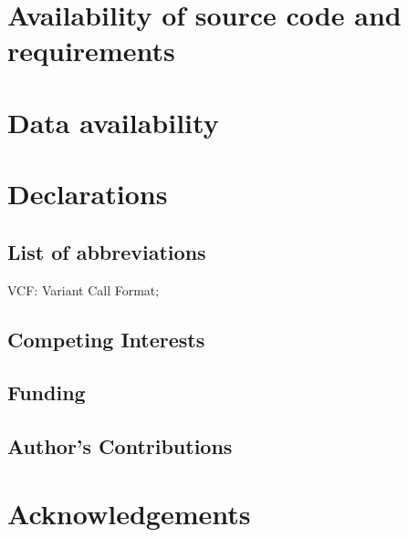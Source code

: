 \documentclass[a4paper,num-refs]{oup-contemporary}
\begin{document}
\section{Availability of source code and requirements}

\section{Data availability}

\section{Declarations}

\subsection{List of abbreviations}

VCF: Variant Call Format;

\subsection{Competing Interests}

\subsection{Funding}

\subsection{Author's Contributions}

\section{Acknowledgements}







\end{document}

